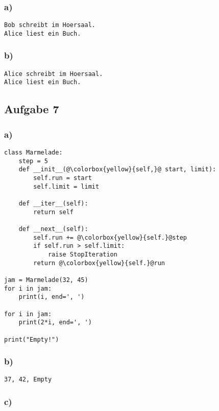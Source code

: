 \documentclass{scrartcl}
\begin{document}
\subsubsection*{a)}

\begin{verbatim}
Bob schreibt im Hoersaal.
Alice liest ein Buch.
\end{verbatim}

\subsubsection*{b)}

\begin{verbatim}
Alice schreibt im Hoersaal.
Alice liest ein Buch.
\end{verbatim}

\subsection*{Aufgabe 7}

\subsubsection*{a)}

\begin{lstlisting}[escapechar=@]
class Marmelade:
    step = 5
    def __init__(@\colorbox{yellow}{self,}@ start, limit):
        self.run = start
        self.limit = limit

    def __iter__(self):
        return self

    def __next__(self):
        self.run += @\colorbox{yellow}{self.}@step
        if self.run > self.limit:
            raise StopIteration
        return @\colorbox{yellow}{self.}@run

jam = Marmelade(32, 45)
for i in jam:
    print(i, end=', ')

for i in jam:
    print(2*i, end=', ')

print("Empty!")

\end{lstlisting}

\subsubsection*{b)}

\begin{verbatim}
37, 42, Empty
\end{verbatim}

\subsubsection*{c)}
\end{document}
